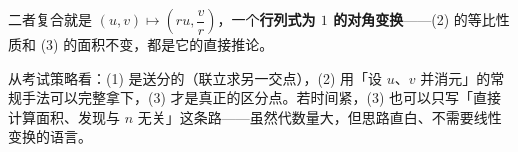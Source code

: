 \begin{answer}
\begin{gktip}
二者复合就是 $(u,v)\mapsto\left(ru,\dfrac vr\right)$，一个\textbf{行列式为 $1$ 的对角变换}——(2) 的等比性质和 (3) 的面积不变，都是它的直接推论。

从考试策略看：(1) 是送分的（联立求另一交点），(2) 用「设 $u$、$v$ 并消元」的常规手法可以完整拿下，(3) 才是真正的区分点。若时间紧，(3) 也可以只写「直接计算面积、发现与 $n$ 无关」这条路——虽然代数量大，但思路直白、不需要线性变换的语言。
\end{gktip}




\end{answer}